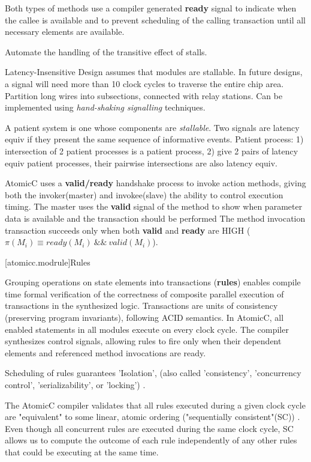Both types of methods use a compiler generated \textbf{ready} signal
to indicate when the callee is available and
to prevent scheduling of the calling transaction until all necessary elements are
available.

Automate the handling of the transitive effect of stalls.

Latency-Insensitive Design assumes that modules are stallable.
In future designs, a signal will need more than 10 clock cycles
to traverse the entire chip area.  Partition long wires into
subsections, connected with relay stations.
Can be implemented using \textit{hand-shaking signalling} techniques.
\cite{carloni2001theory}

A patient system is one whose components are \textit{stallable}.
Two signals are latency equiv if they present the same sequence of
informative events.
Patient process: 1) intersection of 2 patient processes is a patient
process, 2) give 2 pairs of latency equiv patient processes,
their pairwise intersections are also latency equiv.

AtomicC uses a \textbf{valid/ready} handshake process\cite{Fletcher2009, AXISpec} to invoke action methods,
giving both the invoker(master) and invokee(slave) the ability to control execution timing.
The master uses the \textbf{valid} signal
of the method to show when parameter data is available and the transaction should be performed
The method invocation transaction succeeds only when
both \textbf{valid} and \textbf{ready} are HIGH ($\pi(M_{i}) \equiv ready(M_{i})\ \&\&\ valid(M_{i})$).

[atomicc.modrule]{Rules}

Grouping operations on state elements into transactions (\textbf{rules})
enables compile time formal verification of the correctness of
composite parallel execution of transactions
in the synthesized logic.
Transactions are units of consistency (preserving program invariants), following ACID semantics.
In AtomicC, all enabled statements in all modules execute on every clock cycle.
The compiler synthesizes control signals, allowing rules to fire
only when their dependent elements and referenced method invocations are ready.

Scheduling of rules guarantees 'Isolation',
(also called 'consistency', 'concurrency control', 'serializability', or 'locking')
\cite[Sec.~7.1]{GrayR93}.

The AtomicC compiler
validates that all rules executed during a given clock cycle are "equivalent"
to some linear, atomic ordering ("sequentially consistent"(SC))
\cite{Lamport:1979:MMC:1311099.1311750}.
Even though all concurrent rules are executed during the same clock cycle,
SC allows us to compute the
outcome of each rule independently of any other rules that could be executing at the same time.

